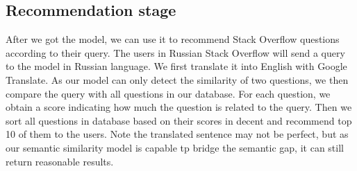 	
	
	\subsection{Recommendation stage}
	After we got the model, we can use it to recommend Stack Overflow questions according to their query.
	The users in Russian Stack Overflow will send a query to the model in Russian language.
	We first translate it into English with Google Translate.
	As our model can only detect the similarity of two questions, we then compare the query with all questions in our database.
	For each question, we obtain a score indicating how much the question is related to the query.
	Then we sort all questions in database based on their scores in decent and recommend top 10 of them to the users.
	Note the translated sentence may not be perfect, but as our semantic similarity model is capable tp bridge the semantic gap, it can still return reasonable results.
	